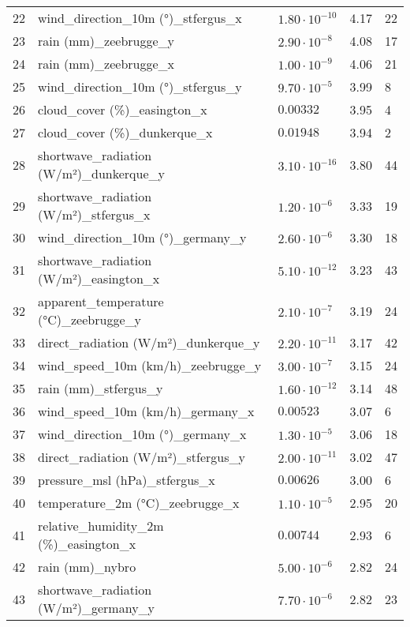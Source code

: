 \begin{table}[H]
\begin{tabular}{r l l l l}
        22 & wind\_direction\_10m (°)\_stfergus\_x & $1.80 \cdot 10^{-10}$ & 4.17 & 22 \\
        23 & rain (mm)\_zeebrugge\_y & $2.90 \cdot 10^{-8}$ & 4.08 & 17 \\
        24 & rain (mm)\_zeebrugge\_x & $1.00 \cdot 10^{-9}$ & 4.06 & 21 \\
        25 & wind\_direction\_10m (°)\_stfergus\_y & $9.70 \cdot 10^{-5}$ & 3.99 & 8 \\
        26 & cloud\_cover (\%)\_easington\_x & $0.00332$ & 3.95 & 4 \\
        27 & cloud\_cover (\%)\_dunkerque\_x & $0.01948$ & 3.94 & 2 \\
        28 & shortwave\_radiation (W/m²)\_dunkerque\_y & $3.10 \cdot 10^{-16}$ & 3.80 & 44 \\
        29 & shortwave\_radiation (W/m²)\_stfergus\_x & $1.20 \cdot 10^{-6}$ & 3.33 & 19 \\
        30 & wind\_direction\_10m (°)\_germany\_y & $2.60 \cdot 10^{-6}$ & 3.30 & 18 \\
        31 & shortwave\_radiation (W/m²)\_easington\_x & $5.10 \cdot 10^{-12}$ & 3.23 & 43 \\
        32 & apparent\_temperature (°C)\_zeebrugge\_y & $2.10 \cdot 10^{-7}$ & 3.19 & 24 \\
        33 & direct\_radiation (W/m²)\_dunkerque\_y & $2.20 \cdot 10^{-11}$ & 3.17 & 42 \\
        34 & wind\_speed\_10m (km/h)\_zeebrugge\_y & $3.00 \cdot 10^{-7}$ & 3.15 & 24 \\
        35 & rain (mm)\_stfergus\_y & $1.60 \cdot 10^{-12}$ & 3.14 & 48 \\
        36 & wind\_speed\_10m (km/h)\_germany\_x & $0.00523$ & 3.07 & 6 \\
        37 & wind\_direction\_10m (°)\_germany\_x & $1.30 \cdot 10^{-5}$ & 3.06 & 18 \\
        38 & direct\_radiation (W/m²)\_stfergus\_y & $2.00 \cdot 10^{-11}$ & 3.02 & 47 \\
        39 & pressure\_msl (hPa)\_stfergus\_x & $0.00626$ & 3.00 & 6 \\
        40 & temperature\_2m (°C)\_zeebrugge\_x & $1.10 \cdot 10^{-5}$ & 2.95 & 20 \\
        41 & relative\_humidity\_2m (\%)\_easington\_x & $0.00744$ & 2.93 & 6 \\
        42 & rain (mm)\_nybro & $5.00 \cdot 10^{-6}$ & 2.82 & 24 \\
        43 & shortwave\_radiation (W/m²)\_germany\_y & $7.70 \cdot 10^{-6}$ & 2.82 & 23 \\

\end{tabular}
\end{table}
